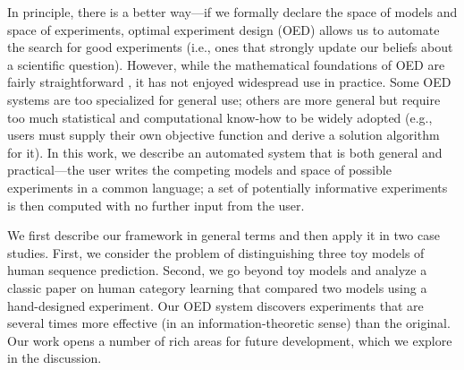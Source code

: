 \documentclass[10pt,letterpaper]{article}
\begin{document}
In principle, there is a better way---if we formally declare the space of models and space of experiments, optimal experiment design (OED) allows us to automate the search for good experiments (i.e., ones that strongly update our beliefs about a scientific question).
However, while the mathematical foundations of OED are fairly straightforward \citep{Lindley1956}, it has not enjoyed widespread use in practice.
Some OED systems are too specialized for general use; others are more general but require too much statistical and computational know-how to be widely adopted (e.g., users must supply their own objective function and derive a solution algorithm for it).
In this work, we describe an automated system that is both general and practical---the user writes the competing models and space of possible experiments in a common language; a set of potentially informative experiments is then computed with no further input from the user.




We first describe our framework in general terms and then apply it in two case studies.
First, we consider the problem of distinguishing three toy models of human sequence prediction.
Second, we go beyond toy models and analyze a classic paper \citep{medin78:pr} on human category learning that compared two models using a hand-designed experiment.
Our OED system discovers experiments that are several times more effective (in an information-theoretic sense) than the original.
Our work opens a number of rich areas for future development, which we explore in the discussion.
\end{document}
